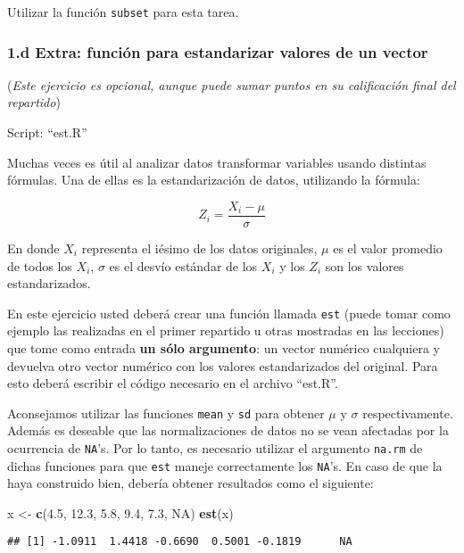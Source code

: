 \documentclass[]{article}
\newenvironment{Shaded}{}{}
\newcommand{\KeywordTok}[1]{\textcolor[rgb]{0.00,0.44,0.13}{\textbf{{#1}}}}
\newcommand{\FloatTok}[1]{\textcolor[rgb]{0.25,0.63,0.44}{{#1}}}
\newcommand{\StringTok}[1]{\textcolor[rgb]{0.25,0.44,0.63}{{#1}}}
\newcommand{\OtherTok}[1]{\textcolor[rgb]{0.00,0.44,0.13}{{#1}}}
\newcommand{\NormalTok}[1]{{#1}}
\begin{document}
Utilizar la función \texttt{subset} para esta tarea.

\subsubsection{1.d Extra: función para estandarizar valores de un
vector}

(\emph{Este ejercicio es opcional, aunque puede sumar puntos en su
calificación final del repartido})

Script: ``est.R''

Muchas veces es útil al analizar datos transformar variables usando
distintas fórmulas. Una de ellas es la estandarización de datos,
utilizando la fórmula:

\[
  Z_i = \frac{X_i - \mu}{\sigma}
\]

En donde $X_i$ representa el iésimo de los datos originales, $\mu$ es el
valor promedio de todos los $X_i$, $\sigma$ es el desvío estándar de los
$X_i$ y los $Z_i$ son los valores estandarizados.

En este ejercicio usted deberá crear una función llamada \texttt{est}
(puede tomar como ejemplo las realizadas en el primer repartido u otras
mostradas en las lecciones) que tome como entrada \textbf{un sólo
argumento}: un vector numérico cualquiera y devuelva otro vector
numérico con los valores estandarizados del original. Para esto deberá
escribir el código necesario en el archivo ``est.R''.

Aconsejamos utilizar las funciones \texttt{mean} y \texttt{sd} para
obtener $\mu$ y $\sigma$ respectivamente. Además es deseable que las
normalizaciones de datos no se vean afectadas por la ocurrencia de
\texttt{NA}'s. Por lo tanto, es necesario utilizar el argumento
\texttt{na.rm} de dichas funciones para que \texttt{est} maneje
correctamente los \texttt{NA}'s. En caso de que la haya construido bien,
debería obtener resultados como el siguiente:

\begin{Shaded}
\begin{Highlighting}[]
\NormalTok{x <-}\StringTok{ }\KeywordTok{c}\NormalTok{(}\FloatTok{4.5}\NormalTok{, }\FloatTok{12.3}\NormalTok{, }\FloatTok{5.8}\NormalTok{, }\FloatTok{9.4}\NormalTok{, }\FloatTok{7.3}\NormalTok{, }\OtherTok{NA}\NormalTok{)}
\KeywordTok{est}\NormalTok{(x)}
\end{Highlighting}
\end{Shaded}

\begin{verbatim}
## [1] -1.0911  1.4418 -0.6690  0.5001 -0.1819      NA
\end{verbatim}
\end{document}
